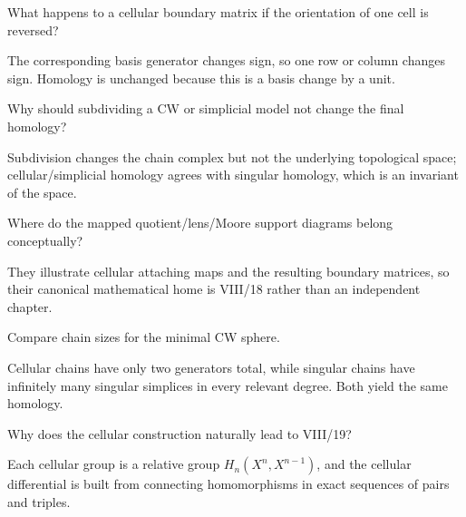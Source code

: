 \begin{problem}\label{prob:viii18-20}
What happens to a cellular boundary matrix if the orientation of one cell is reversed?
\end{problem}
\begin{solution}
The corresponding basis generator changes sign, so one row or column changes sign. Homology is unchanged because this is a basis change by a unit.
\end{solution}

\begin{problem}\label{prob:viii18-21}
Why should subdividing a CW or simplicial model not change the final homology?
\end{problem}
\begin{solution}
Subdivision changes the chain complex but not the underlying topological space; cellular/simplicial homology agrees with singular homology, which is an invariant of the space.
\end{solution}

\begin{problem}\label{prob:viii18-22}
Where do the mapped quotient/lens/Moore support diagrams belong conceptually?
\end{problem}
\begin{solution}
They illustrate cellular attaching maps and the resulting boundary matrices, so their canonical mathematical home is VIII/18 rather than an independent chapter.
\end{solution}

\begin{problem}\label{prob:viii18-23}
Compare chain sizes for the minimal CW sphere.
\end{problem}
\begin{solution}
Cellular chains have only two generators total, while singular chains have infinitely many singular simplices in every relevant degree. Both yield the same homology.
\end{solution}

\begin{problem}\label{prob:viii18-24}
Why does the cellular construction naturally lead to VIII/19?
\end{problem}
\begin{solution}
Each cellular group is a relative group \(H_n(X^n,X^{n-1})\), and the cellular differential is built from connecting homomorphisms in exact sequences of pairs and triples.
\end{solution}
